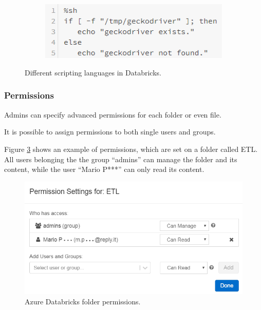 \begin{figure}
        \begin{subfigure}{0.4\textwidth}
            \includegraphics[width=\textwidth]{res/azure/databricks/bash.png}
            \label{fig:azure:databricks:bash}
        \end{subfigure}
        
        \caption{Different scripting languages in Databricks.}
    \end{figure}
    
\subsubsection{Permissions}
    Admins can specify advanced permissions for each folder or even file.
    
    It is possible to assign permissions to both single users and groups.
    
    Figure \ref{fig:azure:databricks:permissions} shows an example of permissions, which are set on a folder called ETL.
    All users belonging the the group ``admins'' can manage the folder and its content, while the user ``Mario P***'' can only read its content.
    
    \begin{figure}
        \centering
        \includegraphics[width=.7\textwidth]{res/azure/databricks/permissions.png}
        \caption{Azure Databricks folder permissions.}
        \label{fig:azure:databricks:permissions}
    \end{figure}
    
